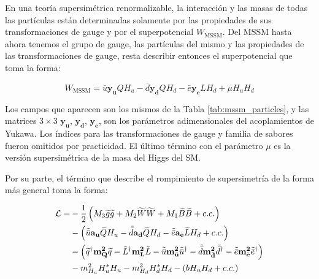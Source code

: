 En una teoría supersimétrica renormalizable, la interacción y las masas de todas las partículas están determinadas solamente por las propiedades de sus transformaciones de gauge y por el superpotencial $W_{\text{MSSM}}$. 
Del MSSM hasta ahora tenemos el grupo de gauge, las partículas del mismo y las propiedades de las transformaciones de gauge, resta describir entonces el superpotencial que toma la forma:

\begin{equation}
	W_{\text{MSSM}} = \bar{u}\textbf{y}_\textbf{u}QH_u - \bar{d}\textbf{y}_\textbf{d}QH_d - \bar{e}\textbf{y}_\textbf{e}LH_d + \mu H_u H_d
	\label{eq:susy_potential}
\end{equation}

Los campos que aparecen son los mismos de la Tabla \ref{tab:mssm_particles}, y las matrices $3\times3$ $\textbf{y}_\textbf{u}$, $\textbf{y}_\textbf{d}$, $\textbf{y}_\textbf{e}$, son los parámetros adimensionales del acoplamientos de Yukawa. Los índices para las transformaciones de gauge y familia de sabores fueron omitidos por practicidad. El último término con el parámetro $\mu$ es la versión supersimétrica de la masa del Higgs del SM.

Por su parte, el término que describe el rompimiento de supersimetría de la forma más general toma la forma:

\begin{equation}
	\begin{split}
		\mathcal{L} = & -\frac{1}{2}\left( M_3 \widetilde{g}\widetilde{g} + M_2 \widetilde{W}\widetilde{W} + M_1 \widetilde{B}\widetilde{B} + c.c. \right) \\
			& - \left( \tilde{\bar{u}}\textbf{a}_\textbf{u}\widetilde{Q}H_u -  \tilde{\bar{d}}\textbf{a}_\textbf{d}\widetilde{Q}H_d -  \tilde{\bar{e}}\textbf{a}_\textbf{e}\widetilde{L}H_d + c.c. \right) \\
			& - \left( \widetilde{q}^{\dagger} \textbf{m}_{\textbf{Q}}^{\textbf{2}}\widetilde{q} - \tilde{L}^{\dagger}\textbf{m}_{\textbf{L}}^{\textbf{2}}\tilde{L} - \tilde{\bar{u}}\textbf{m}_{\bar{\textbf{u}}}^{\textbf{2}}\tilde{\bar{u}}^{\dagger} - \tilde{\bar{d}}\textbf{m}_{\bar{\textbf{d}}}^{\textbf{2}}\tilde{\bar{d}}^{\dagger} - \tilde{\bar{e}}\textbf{m}_{\bar{\textbf{e}}}^{\textbf{2}}\tilde{\bar{e}}^{\dagger} \right) \\
			& - m_{H_u}^2 H_u^* H_u - m_{H_d}^2 H_d^* H_d - (b H_u H_d + c.c.) \\
	\end{split}
\end{equation}

